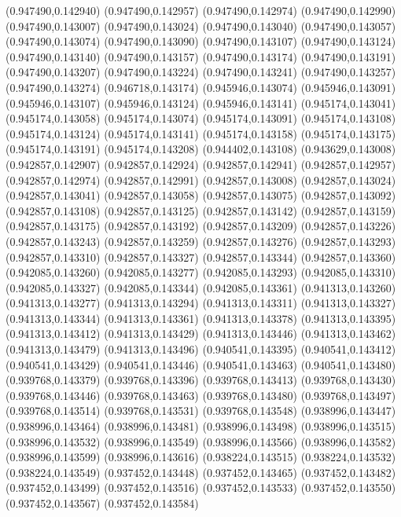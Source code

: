 (0.947490,0.142940)
(0.947490,0.142957)
(0.947490,0.142974)
(0.947490,0.142990)
(0.947490,0.143007)
(0.947490,0.143024)
(0.947490,0.143040)
(0.947490,0.143057)
(0.947490,0.143074)
(0.947490,0.143090)
(0.947490,0.143107)
(0.947490,0.143124)
(0.947490,0.143140)
(0.947490,0.143157)
(0.947490,0.143174)
(0.947490,0.143191)
(0.947490,0.143207)
(0.947490,0.143224)
(0.947490,0.143241)
(0.947490,0.143257)
(0.947490,0.143274)
(0.946718,0.143174)
(0.945946,0.143074)
(0.945946,0.143091)
(0.945946,0.143107)
(0.945946,0.143124)
(0.945946,0.143141)
(0.945174,0.143041)
(0.945174,0.143058)
(0.945174,0.143074)
(0.945174,0.143091)
(0.945174,0.143108)
(0.945174,0.143124)
(0.945174,0.143141)
(0.945174,0.143158)
(0.945174,0.143175)
(0.945174,0.143191)
(0.945174,0.143208)
(0.944402,0.143108)
(0.943629,0.143008)
(0.942857,0.142907)
(0.942857,0.142924)
(0.942857,0.142941)
(0.942857,0.142957)
(0.942857,0.142974)
(0.942857,0.142991)
(0.942857,0.143008)
(0.942857,0.143024)
(0.942857,0.143041)
(0.942857,0.143058)
(0.942857,0.143075)
(0.942857,0.143092)
(0.942857,0.143108)
(0.942857,0.143125)
(0.942857,0.143142)
(0.942857,0.143159)
(0.942857,0.143175)
(0.942857,0.143192)
(0.942857,0.143209)
(0.942857,0.143226)
(0.942857,0.143243)
(0.942857,0.143259)
(0.942857,0.143276)
(0.942857,0.143293)
(0.942857,0.143310)
(0.942857,0.143327)
(0.942857,0.143344)
(0.942857,0.143360)
(0.942085,0.143260)
(0.942085,0.143277)
(0.942085,0.143293)
(0.942085,0.143310)
(0.942085,0.143327)
(0.942085,0.143344)
(0.942085,0.143361)
(0.941313,0.143260)
(0.941313,0.143277)
(0.941313,0.143294)
(0.941313,0.143311)
(0.941313,0.143327)
(0.941313,0.143344)
(0.941313,0.143361)
(0.941313,0.143378)
(0.941313,0.143395)
(0.941313,0.143412)
(0.941313,0.143429)
(0.941313,0.143446)
(0.941313,0.143462)
(0.941313,0.143479)
(0.941313,0.143496)
(0.940541,0.143395)
(0.940541,0.143412)
(0.940541,0.143429)
(0.940541,0.143446)
(0.940541,0.143463)
(0.940541,0.143480)
(0.939768,0.143379)
(0.939768,0.143396)
(0.939768,0.143413)
(0.939768,0.143430)
(0.939768,0.143446)
(0.939768,0.143463)
(0.939768,0.143480)
(0.939768,0.143497)
(0.939768,0.143514)
(0.939768,0.143531)
(0.939768,0.143548)
(0.938996,0.143447)
(0.938996,0.143464)
(0.938996,0.143481)
(0.938996,0.143498)
(0.938996,0.143515)
(0.938996,0.143532)
(0.938996,0.143549)
(0.938996,0.143566)
(0.938996,0.143582)
(0.938996,0.143599)
(0.938996,0.143616)
(0.938224,0.143515)
(0.938224,0.143532)
(0.938224,0.143549)
(0.937452,0.143448)
(0.937452,0.143465)
(0.937452,0.143482)
(0.937452,0.143499)
(0.937452,0.143516)
(0.937452,0.143533)
(0.937452,0.143550)
(0.937452,0.143567)
(0.937452,0.143584)
